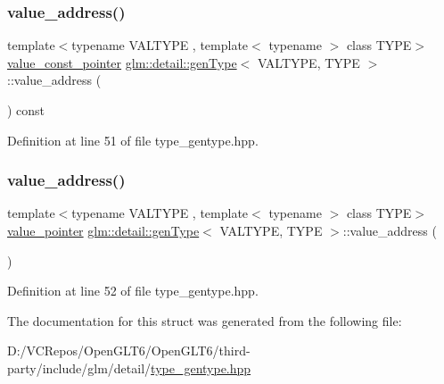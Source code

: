 \subsubsection{\texorpdfstring{value\_address()}{value\_address()}\hspace{0.1cm}{\footnotesize\ttfamily [1/2]}}
{\footnotesize\ttfamily template$<$typename V\+A\+L\+T\+Y\+PE , template$<$ typename $>$ class T\+Y\+PE$>$ \\
\mbox{\hyperlink{structglm_1_1detail_1_1gen_type_a34e169ae6d50e1c76574c850eae2c7fc}{value\+\_\+const\+\_\+pointer}} \mbox{\hyperlink{structglm_1_1detail_1_1gen_type}{glm\+::detail\+::gen\+Type}}$<$ V\+A\+L\+T\+Y\+PE, T\+Y\+PE $>$\+::value\+\_\+address (\begin{DoxyParamCaption}{ }\end{DoxyParamCaption}) const\hspace{0.3cm}{\ttfamily [inline]}}



Definition at line 51 of file type\+\_\+gentype.\+hpp.

\mbox{\label{structglm_1_1detail_1_1gen_type_a146973ec142766743080c1895a9e3c65}} 
\subsubsection{\texorpdfstring{value\_address()}{value\_address()}\hspace{0.1cm}{\footnotesize\ttfamily [2/2]}}
{\footnotesize\ttfamily template$<$typename V\+A\+L\+T\+Y\+PE , template$<$ typename $>$ class T\+Y\+PE$>$ \\
\mbox{\hyperlink{structglm_1_1detail_1_1gen_type_a3b272e7be29ab920f2877c00646f6f9b}{value\+\_\+pointer}} \mbox{\hyperlink{structglm_1_1detail_1_1gen_type}{glm\+::detail\+::gen\+Type}}$<$ V\+A\+L\+T\+Y\+PE, T\+Y\+PE $>$\+::value\+\_\+address (\begin{DoxyParamCaption}{ }\end{DoxyParamCaption})\hspace{0.3cm}{\ttfamily [inline]}}



Definition at line 52 of file type\+\_\+gentype.\+hpp.



The documentation for this struct was generated from the following file\+:\begin{DoxyCompactItemize}
\item 
D\+:/\+V\+C\+Repos/\+Open\+G\+L\+T6/\+Open\+G\+L\+T6/third-\/party/include/glm/detail/\mbox{\hyperlink{type__gentype_8hpp}{type\+\_\+gentype.\+hpp}}\end{DoxyCompactItemize}
